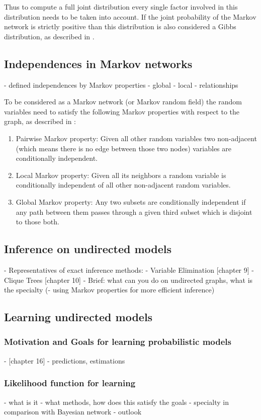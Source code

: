 Thus to compute a full joint distribution every single factor involved in this distribution needs to be taken into account. If the joint probability of the Markov network is strictly positive than this distribution is also considered a Gibbs distribution, as described in \cite{kindermann1980markov}.

\subsection{Independences in Markov networks} \label{sec:indep}

- defined independences by Markov properties
- global
- local
- relationships

To be considered as a Markov network (or Markov random field) the random variables need to satisfy the following Markov properties with respect to the graph, as described in \cite{markov1957theory}:

\begin{enumerate}
\item Pairwise Markov property: Given all other random variables two non-adjacent (which means there is no edge between those two nodes) variables are conditionally independent.
\item Local Markov property: Given all its neighbors a random variable is conditionally independent of all other non-adjacent random variables.
\item Global Markov property: Any two subsets are conditionally independent if any path between them passes through a given third subset which is disjoint to those both.  
\end{enumerate}


\subsection{Inference on undirected models} \label{sec:infer}

- Representatives of exact inference methods:
  - Variable Elimination [chapter 9]
  - Clique Trees [chapter 10]
- Brief: what can you do on undirected graphs, what is the specialty
(- using Markov properties for more efficient inference)

\subsection{Learning undirected models}

\subsubsection{Motivation and Goals for learning probabilistic models}
- [chapter 16]
- predictions, estimations

\subsubsection{Likelihood function for learning}

- what is it
- what methods, how does this satisfy the goals
- specialty in comparison with Bayesian network
- outlook